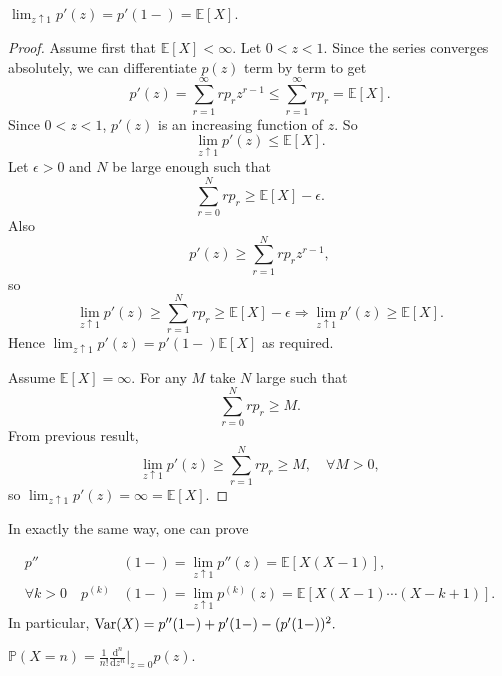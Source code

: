 \begin{theorem}
    $\displaystyle \lim_{z \uparrow 1} p'(z)=p'(1-)=\mathbb{E}[X]$. 
\end{theorem}
\begin{proof}
    Assume first that $ \mathbb{E}[X]< \infty $. Let $ 0<z<1 $. Since the series converges absolutely, we can differentiate $ p(z) $ term by term to get 
    \[
        p'(z) = \sum_{r=1}^{\infty} r p_r z^{r-1}\le \sum_{r=1}^{\infty}rp_r = \mathbb{E}[X].
    \]
    Since $ 0<z<1 $, $ p'(z) $ is an increasing function of $z$. So 
    \[
        \lim_{z \uparrow 1} p'(z)\le \mathbb{E}[X].
    \]
    Let $ \epsilon>0 $ and $N$ be large enough such that 
    \[
        \sum_{r=0}^{N}rp_r\ge \mathbb{E}[X]-\epsilon.
    \]
    Also 
    \[
        p'(z)\ge \sum_{r=1}^{N}rp_rz^{r-1},
    \]
    so 
    \[
        \lim_{z \uparrow 1} p'(z) \ge \sum_{r=1}^{N}rp_r\ge \mathbb{E}[X]-\epsilon \Longrightarrow \lim_{z \uparrow 1} p'(z) \ge \mathbb{E}[X].
    \]
    Hence $\lim_{z \uparrow 1} p'(z)=p'(1-)\mathbb{E}[X]$ as required.

    Assume $ \mathbb{E}[X]=\infty $. For any $M$ take $N$ large such that 
    \[
        \sum_{r=0}^{N}rp_r\ge M.
    \]
    From previous result,
    \[
        \lim_{z \uparrow 1} p'(z)\ge \sum_{r=1}^{N}rp_r\ge M,\quad \forall M>0,
    \]
    so $ \lim_{z \uparrow 1} p'(z)=\infty =\mathbb{E}[X]$.
\end{proof}
In exactly the same way, one can prove 
\begin{theorem}
    \begin{align*}
        p''&(1-)=\lim_{z \uparrow 1}p''(z)=\mathbb{E}[X(X-1)],\\
        \forall k>0\quad  p^{(k)}&(1-)=\lim_{z \uparrow 1}p^{(k)}(z) = \mathbb{E}[X(X-1)\cdots(X-k+1)].
    \end{align*}
    In particular, $ \operatorname{Var}(X)=p''(1-)+p'(1-)-(p'(1-))^2. $ 
\end{theorem}

\begin{proposition}
    $\displaystyle \mathbb{P}(X=n) = \frac{1}{n!}\frac{\mathrm{d}^n}{\mathrm{d}z^n}\Big|_{z=0}p(z) .$ 
\end{proposition}

